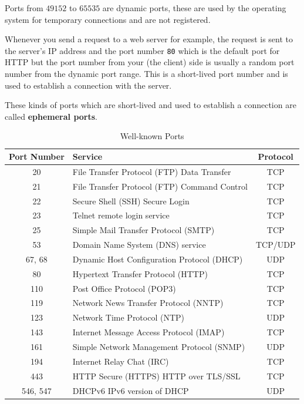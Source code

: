 Ports from $49152$ to $65535$ are dynamic ports, these
are used by the operating system for temporary connections
and are not registered.

Whenever you send a request to a web server for example,
the request is sent to the server's IP address and the
port number \lstinline|80| which is the default port for
HTTP
but the port number from your (the client) side is
usually a random port number from the dynamic port range.
This is a short-lived port number and is used to
establish a connection with the server.

These kinds of ports which are short-lived and used
to establish a connection are called \textbf{ephemeral ports}.

\begin{table}[h!]
\caption{Well-known Ports}
\begin{tabular}{c l c}
\toprule
Port Number & Service & Protocol \\
\midrule
20 & File Transfer Protocol (FTP) Data Transfer & TCP \\
21 & File Transfer Protocol (FTP) Command Control & TCP \\
22 & Secure Shell (SSH) Secure Login & TCP \\
23 & Telnet remote login service& TCP \\
25 & Simple Mail Transfer Protocol (SMTP)& TCP \\
53 & Domain Name System (DNS) service & TCP/UDP \\
67, 68 & Dynamic Host Configuration Protocol (DHCP) & UDP \\
80 & Hypertext Transfer Protocol (HTTP) & TCP \\
110 & Post Office Protocol (POP3) & TCP \\
119 & Network News Transfer Protocol (NNTP) & TCP \\
123 & Network Time Protocol (NTP) & UDP \\
143 & Internet Message Access Protocol (IMAP) & TCP \\
161 & Simple Network Management Protocol (SNMP) & UDP \\
194 & Internet Relay Chat (IRC) & TCP \\
443 & HTTP Secure (HTTPS) HTTP over TLS/SSL & TCP \\
546, 547 & DHCPv6 IPv6 version of DHCP & UDP \\
\bottomrule
\end{tabular}
\end{table}

